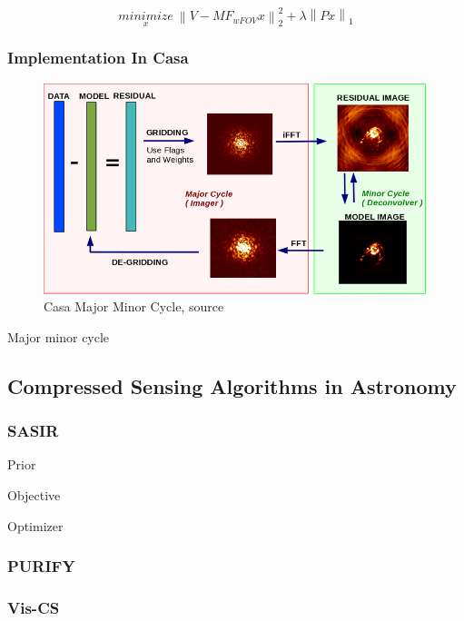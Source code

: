 \begin{equation}\label{cs:eq:wfield}
	\underset{x}{minimize} \: \left \| V - MF_{wFOV} x \right \|_2^2 + \lambda \left \| Px\right \|_1
\end{equation}





\subsubsection{Implementation In Casa}

\begin{figure}
	\centering
	\includegraphics[width=0.9\linewidth]{./chapters/04.cs/img/casa_major_minor.png}
	\caption{Casa Major Minor Cycle, source \cite{casa2018major}}
	\label{cs:major}
	\vspace{-10pt}
\end{figure}


Major minor cycle





\subsection{Compressed Sensing Algorithms in Astronomy}

\subsubsection{SASIR}
Prior

Objective

Optimizer

\subsubsection{PURIFY}

\subsubsection{Vis-CS}


 
